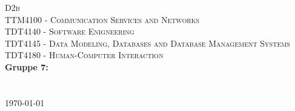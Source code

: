 \begin{titlepage}
\begin{center}

\vspace*{3cm}
\textsc{\Huge D2b}\\[0.7cm]
\textsc{\medium TTM4100 - Communication Services and Networks}\\[0.3cm]
\textsc{\medium TDT4140 - Software Enigneering}\\[0.3cm]
\textsc{\medium TDT4145 - Data Modeling, Databases and Database Management Systems}\\[0.3cm]
\textsc{\medium TDT4180 - Human-Computer Interaction}\\[0.3cm]

\textbf{\Large Gruppe 7:} \\[0.2cm]
 \\
\\[1cm]

\today

\end{center}
\end{titlepage}